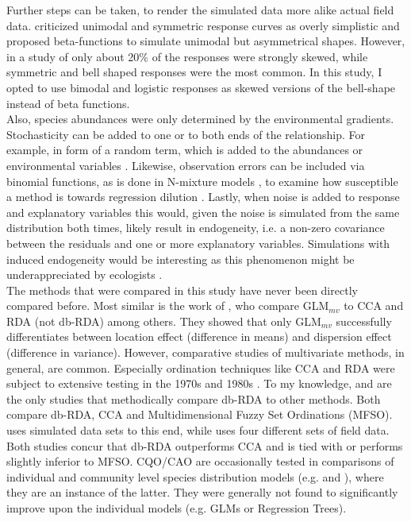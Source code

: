 	Further steps can be taken, to render the simulated data more alike actual field data. 
	\citet{Austin1999} criticized unimodal and symmetric response curves as overly simplistic and \citet{austin1994determining} proposed beta-functions to simulate unimodal but asymmetrical shapes. 
	However, in a study of \citet{Oksanen2002} only about 20\% of the responses were strongly skewed, while symmetric and bell shaped responses were the most common. 
	In this study, I opted to use bimodal and logistic responses as skewed versions of the bell-shape instead of beta functions. \\
	Also, species abundances were only determined by the environmental gradients. 
	Stochasticity can be added to one or to both ends of the relationship. 
	For example, in form of a random term, which is added to the abundances or environmental variables \citep[e.g][]{McCune1997}.
	Likewise, observation errors can be included via binomial functions, as is done in N-mixture models \citep{royle2004n},
	to examine how susceptible a method is towards regression dilution \citep[e.g.][]{frost2000correcting, McInerny2011}.
	Lastly, when noise is added to response and explanatory variables this would, given the noise is simulated from the same distribution both times, likely result in endogeneity, i.e. a non-zero covariance between the residuals and one or more explanatory variables. 
	Simulations with induced endogeneity would be interesting as this phenomenon might be underappreciated by ecologists \citep{armsworth2009contrasting, fox2015ecological}. \\ 

 
 	The methods that were compared in this study have never been directly compared before. 
 	Most similar is the work of \citet{Warton2012}, who compare GLM$_{mv}$ to CCA and RDA (not db-RDA) among others. 
 	They showed that only GLM$_{mv}$ successfully differentiates between location effect (difference in means) and dispersion effect (difference in variance). 
 	However, comparative studies of multivariate methods, in general, are common. 
 	Especially ordination techniques like CCA and RDA were subject to extensive testing in the 1970s and 1980s \citep[e.g.][]{GauchJr.1972, GauchJr1977, Kenkel1986}. 
 	To my knowledge, \citet{Roberts2008} and \citet{Roberts2009} are the only studies that methodically compare db-RDA to other methods. 
 	Both compare db-RDA, CCA and Multidimensional Fuzzy Set Ordinations (MFSO). \citet{Roberts2008} uses simulated data sets to this end, while \citet{Roberts2009} uses four different sets of field data. 
 	Both studies concur that db-RDA outperforms CCA and is tied with or performs slightly inferior to MFSO. 
 	CQO/CAO are occasionally tested in comparisons of individual and community level species distribution models (e.g. \citet{Baselga2009} and \citet{Maguire2016}), where they are an instance of the latter.
 	They were generally not found to significantly improve upon the individual models (e.g. GLMs or Regression Trees). 
 	\\
 
